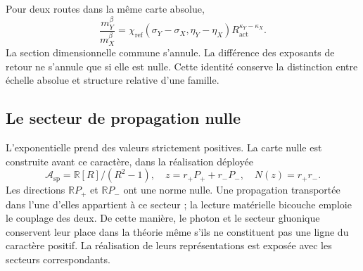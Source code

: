 Pour deux routes dans la même carte absolue,
\[
 \frac{m_Y^\beta}{m_X^\beta}
 =\chi_{\mathrm{ref}}(\sigma_Y-\sigma_X,\eta_Y-\eta_X)
 R_{\mathrm{act}}^{\kappa_Y-\kappa_X}.
\]
La section dimensionnelle commune s'annule. La différence des exposants de
retour ne s'annule que si elle est nulle. Cette identité conserve la
distinction entre échelle absolue et structure relative d'une famille.

\subsection{Le secteur de propagation nulle}

L'exponentielle prend des valeurs strictement positives. La carte nulle est
construite avant ce caractère, dans la réalisation déployée
\[
 \mathcal A_{\mathrm{sp}}=\mathbb R[R]/(R^2-1),\quad
 z=r_+P_++r_-P_-,\quad N(z)=r_+r_-.
\]
Les directions \(\mathbb RP_+\) et \(\mathbb RP_-\) ont une norme
nulle. Une propagation transportée dans l’une d’elles appartient à ce secteur ;
la lecture matérielle bicouche emploie le couplage des deux. De cette manière,
le photon et le secteur gluonique conservent leur place dans la théorie même
s’ils ne constituent pas une ligne du caractère positif. La réalisation de leurs
représentations est exposée avec les secteurs correspondants.
